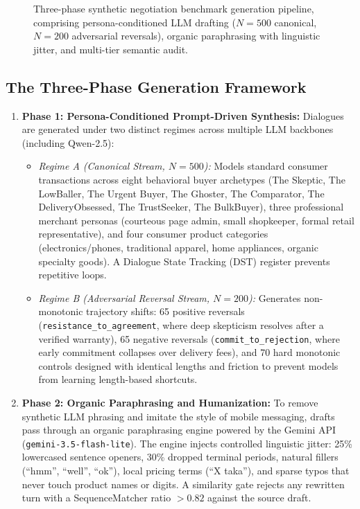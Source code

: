 \begin{figure}[htbp]
  \centering
  \resizebox{\textwidth}{!}{}
  \caption{Three-phase synthetic negotiation benchmark generation pipeline, comprising persona-conditioned LLM drafting ($N=500$ canonical, $N=200$ adversarial reversals), organic paraphrasing with linguistic jitter, and multi-tier semantic audit.}
  \label{fig:datagen_pipeline}
\end{figure}

\subsection{The Three-Phase Generation Framework}
\begin{enumerate}
  \item \textbf{Phase 1: Persona-Conditioned Prompt-Driven Synthesis:} Dialogues are generated under two distinct regimes across multiple LLM backbones (including Qwen-2.5):
    \begin{itemize}
      \item \textit{Regime A (Canonical Stream, $N=500$):} Models standard consumer transactions across eight behavioral buyer archetypes (The Skeptic, The LowBaller, The Urgent Buyer, The Ghoster, The Comparator, The DeliveryObsessed, The TrustSeeker, The BulkBuyer), three professional merchant personas (courteous page admin, small shopkeeper, formal retail representative), and four consumer product categories (electronics/phones, traditional apparel, home appliances, organic specialty goods). A Dialogue State Tracking (DST) register prevents repetitive loops.
      \item \textit{Regime B (Adversarial Reversal Stream, $N=200$):} Generates non-monotonic trajectory shifts: 65 positive reversals (\texttt{resistance\_to\_agreement}, where deep skepticism resolves after a verified warranty), 65 negative reversals (\texttt{commit\_to\_rejection}, where early commitment collapses over delivery fees), and 70 hard monotonic controls designed with identical lengths and friction to prevent models from learning length-based shortcuts.
    \end{itemize}
  \item \textbf{Phase 2: Organic Paraphrasing and Humanization:} To remove synthetic LLM phrasing and imitate the style of mobile messaging, drafts pass through an organic paraphrasing engine powered by the Gemini API (\texttt{gemini-3.5-flash-lite}). The engine injects controlled linguistic jitter: 25\% lowercased sentence openers, 30\% dropped terminal periods, natural fillers (``hmm'', ``well'', ``ok''), local pricing terms (``X taka''), and sparse typos that never touch product names or digits. A similarity gate rejects any rewritten turn with a SequenceMatcher ratio $>0.82$ against the source draft.

\end{enumerate}
